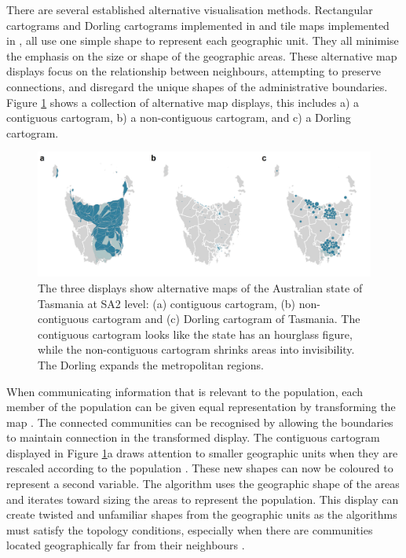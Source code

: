 There are several established alternative visualisation methods.
Rectangular cartograms \citep{ORC} and Dorling cartograms \citep{ACTUC}
implemented in  and tile maps implemented in
, all use one simple shape to represent each
geographic unit. They all minimise the emphasis on the size or shape of
the geographic areas. These alternative map displays focus on the
relationship between neighbours, attempting to preserve connections, and
disregard the unique shapes of the administrative boundaries. Figure
\ref{fig:tasdisplays} shows a collection of alternative map displays,
this includes a) a contiguous cartogram, b) a non-contiguous cartogram,
and c) a Dorling cartogram.

\begin{Schunk}
\begin{figure}
\includegraphics[width=1\linewidth]{kobakian-cook_files/figure-latex/tasdisplays-1} \caption[The three displays show alternative maps of the Australian state of Tasmania at SA2 level]{The three displays show alternative maps of the Australian state of Tasmania at SA2 level: (a) contiguous cartogram, (b) non-contiguous cartogram and (c) Dorling cartogram of Tasmania. The contiguous cartogram looks like the state has an hourglass figure, while the non-contiguous cartogram shrinks areas into invisibility. The Dorling expands the metropolitan regions.}\label{fig:tasdisplays}
\end{figure}
\end{Schunk}

When communicating information that is relevant to the population, each
member of the population can be given equal representation by
transforming the map \citep{TVSSS}. The connected communities can be
recognised by allowing the boundaries to maintain connection in the
transformed display. The contiguous cartogram displayed in Figure
\ref{fig:tasdisplays}a draws attention to smaller geographic units when
they are rescaled according to the population \citep{DMAHP}. These new
shapes can now be coloured to represent a second variable. The algorithm
uses the geographic shape of the areas and iterates toward sizing the
areas to represent the population. This display can create twisted and
unfamiliar shapes from the geographic units as the algorithms must
satisfy the topology conditions, especially when there are communities
located geographically far from their neighbours \citep{TVSSS}.

